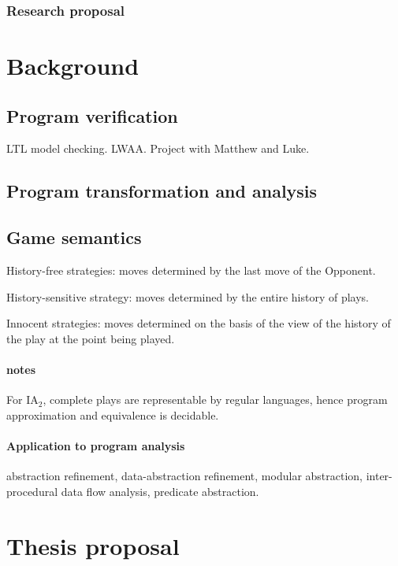 \documentclass[nocenter]{thesis}
\begin{document}
\section{Research proposal}

\part{Background}
\chapter{Program verification}
LTL model checking. LWAA. Project with Matthew and Luke.

\chapter{Program transformation and analysis}


\chapter{Game semantics}

History-free strategies: moves determined by the last move of the
Opponent.

History-sensitive strategy: moves determined by the entire history
of plays.

Innocent strategies: moves determined on the basis of the view of
the history of the play at the point being played.


\subsection{notes} For IA$_2$, complete plays are representable by
regular languages, hence program approximation and equivalence is
decidable.

\subsection{Application to program analysis}
abstraction refinement, data-abstraction refinement, modular
abstraction, inter-procedural data flow analysis, predicate
abstraction.

\part{Thesis proposal}

\chapter{}
\end{document}

